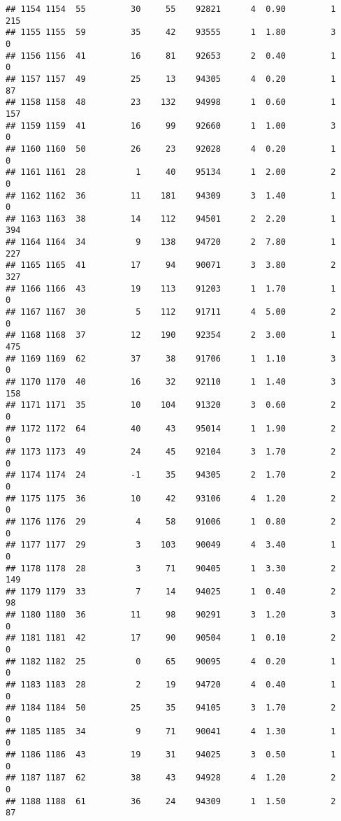 \documentclass[
]{article}
\begin{document}
\begin{verbatim}
## 1154 1154  55         30     55    92821      4  0.90         1      215
## 1155 1155  59         35     42    93555      1  1.80         3        0
## 1156 1156  41         16     81    92653      2  0.40         1        0
## 1157 1157  49         25     13    94305      4  0.20         1       87
## 1158 1158  48         23    132    94998      1  0.60         1      157
## 1159 1159  41         16     99    92660      1  1.00         3        0
## 1160 1160  50         26     23    92028      4  0.20         1        0
## 1161 1161  28          1     40    95134      1  2.00         2        0
## 1162 1162  36         11    181    94309      3  1.40         1        0
## 1163 1163  38         14    112    94501      2  2.20         1      394
## 1164 1164  34          9    138    94720      2  7.80         1      227
## 1165 1165  41         17     94    90071      3  3.80         2      327
## 1166 1166  43         19    113    91203      1  1.70         1        0
## 1167 1167  30          5    112    91711      4  5.00         2        0
## 1168 1168  37         12    190    92354      2  3.00         1      475
## 1169 1169  62         37     38    91706      1  1.10         3        0
## 1170 1170  40         16     32    92110      1  1.40         3      158
## 1171 1171  35         10    104    91320      3  0.60         2        0
## 1172 1172  64         40     43    95014      1  1.90         2        0
## 1173 1173  49         24     45    92104      3  1.70         2        0
## 1174 1174  24         -1     35    94305      2  1.70         2        0
## 1175 1175  36         10     42    93106      4  1.20         2        0
## 1176 1176  29          4     58    91006      1  0.80         2        0
## 1177 1177  29          3    103    90049      4  3.40         1        0
## 1178 1178  28          3     71    90405      1  3.30         2      149
## 1179 1179  33          7     14    94025      1  0.40         2       98
## 1180 1180  36         11     98    90291      3  1.20         3        0
## 1181 1181  42         17     90    90504      1  0.10         2        0
## 1182 1182  25          0     65    90095      4  0.20         1        0
## 1183 1183  28          2     19    94720      4  0.40         1        0
## 1184 1184  50         25     35    94105      3  1.70         2        0
## 1185 1185  34          9     71    90041      4  1.30         1        0
## 1186 1186  43         19     31    94025      3  0.50         1        0
## 1187 1187  62         38     43    94928      4  1.20         2        0
## 1188 1188  61         36     24    94309      1  1.50         2       87

\end{verbatim}
\end{document}
